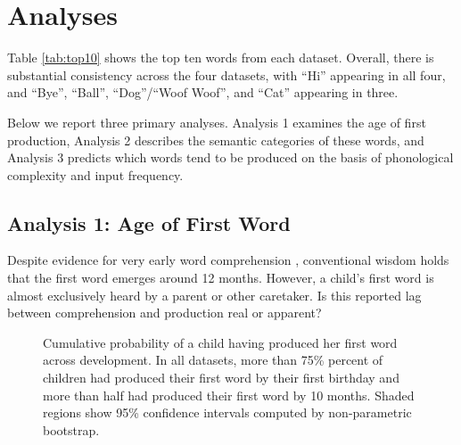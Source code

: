 \documentclass[10pt,letterpaper]{article}
\begin{document}
\section{Analyses}

Table \ref{tab:top10} shows the top ten words from each dataset. Overall, there is substantial consistency across the four datasets, with ``Hi'' appearing in all four, and ``Bye'', ``Ball'', ``Dog''/``Woof Woof'', and ``Cat'' appearing in three.

Below we report three primary analyses. Analysis 1 examines the age of first production, Analysis 2 describes the semantic categories of these words, and Analysis 3 predicts which words tend to be produced on the basis of phonological complexity and input frequency.

\vspace{-.2em}
\subsection{Analysis 1: Age of First Word} 

Despite evidence for very early word comprehension \cite{tincoff2012,bergelson2012}, conventional wisdom holds that the first word emerges around 12 months. However, a child's first word is almost exclusively heard by a parent or other caretaker. Is this reported lag between comprehension and production real or apparent? 

\begin{figure}[tb]
\caption{\label{fig:cdfs} Cumulative probability of a child having produced her first word across development. In all datasets, more than 75\% percent of children had produced their first word by their first birthday and more than half had produced their first word by 10 months. Shaded regions show 95\% confidence intervals computed by non-parametric bootstrap.}
\vspace{-2.6em}
\end{figure}
\end{document}
